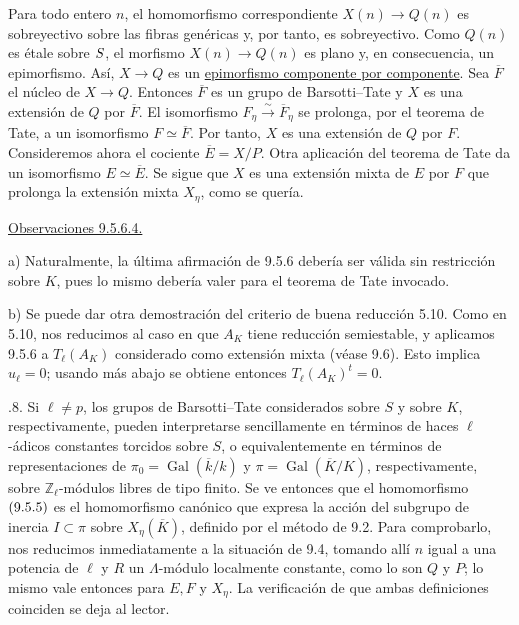 Para todo entero $n$, el homomorfismo correspondiente
$X(n)\longrightarrow Q(n)$ es sobreyectivo sobre las fibras genéricas y,
por tanto, es sobreyectivo. Como $Q(n)$ es étale sobre
$\sisi{n}{S}$, el morfismo $X(n)\longrightarrow Q(n)$ es plano y, en
consecuencia, un epimorfismo. Así, $X\longrightarrow Q$ es un
\underline{epimorfismo componente por componente}. Sea $\overline F$ el
núcleo de $X\longrightarrow Q$. Entonces $\overline F$ es un grupo de
Barsotti--Tate y $X$ es una extensión de $Q$ por $\overline F$. El
isomorfismo $F_\eta\xrightarrow{\sim}\overline F_\eta$ se prolonga, por
el teorema de Tate, a un isomorfismo $F\simeq\overline F$. Por tanto,
$X$ es una extensión de $Q$ por $F$. Consideremos ahora el cociente
$\overline E=X/P$. Otra aplicación del teorema de Tate da un isomorfismo
$E\simeq\overline E$. Se sigue que $X$ es una extensión mixta de $E$
por $F$ que prolonga la extensión mixta $X_\eta$, como se quería.

\medskip
\noindent
\underline{Observaciones 9.5.6.4.}

\smallskip
\noindent
a) Naturalmente, la última afirmación de 9.5.6 debería ser válida sin
restricción sobre $K$, pues lo mismo debería valer para el teorema de
Tate invocado.


\smallskip
\noindent
b) Se puede dar otra demostración del criterio de buena reducción 5.10.
Como en 5.10, nos reducimos al caso en que $A_K$ tiene reducción
semiestable, y aplicamos 9.5.6 a $T_\ell(A_K)$ considerado como extensión
mixta (véase 9.6). Esto implica $u_\ell=0$; usando  más abajo se
obtiene entonces $T_\ell(A_K)^t=0$.

\medskip
{}.8. Si $\ell\neq p$, los grupos de Barsotti--Tate considerados sobre
$S$ y sobre $K$, respectivamente, pueden interpretarse sencillamente en
términos de haces $\ell$-ádicos constantes torcidos sobre $S$, o
equivalentemente en términos de representaciones de
$\pi_0=\operatorname{Gal}(\overline k/k)$ y
$\pi=\operatorname{Gal}(\overline K/K)$, respectivamente, sobre
$\mathbb Z_\ell$-módulos libres de tipo finito. Se ve entonces que el
homomorfismo $(\sisi{9.5.6}{9.5.5})$ es el homomorfismo canónico que
expresa la acción del subgrupo de inercia $I\subset\pi$ sobre
$X_\eta(\overline K)$, definido por el método de 9.2. Para comprobarlo,
nos reducimos inmediatamente a la situación de 9.4, tomando allí $n$
igual a una potencia de $\ell$ y $R$ un $\Lambda$-módulo localmente
constante, como lo son $Q$ y $P$; lo mismo vale entonces para $E,F$ y
$X_\eta$. La verificación de que ambas definiciones coinciden se deja al
lector.

